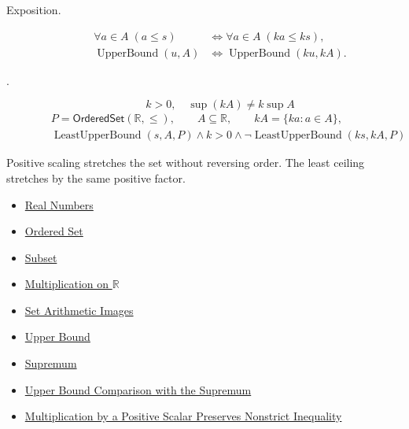 \begin{remark*}
\begin{description}
  \item[Exposition.]
\[
\begin{aligned}
\forall a\in A\;(a\leq s)
&\Longleftrightarrow
\forall a\in A\;(ka\leq ks),\\
\operatorname{UpperBound}(u,A)
&\Longleftrightarrow
\operatorname{UpperBound}(ku,kA).
\end{aligned}
\]


  \item[.]
  \[
k>0,\quad \sup(kA)\ne k\sup A
\]
\[
\begin{aligned}
&P=\mathsf{OrderedSet}(\mathbb{R},\leq),\qquad A\subseteq\mathbb{R},\qquad kA=\{ka:a\in A\},\\
&\operatorname{LeastUpperBound}(s,A,P)\land k>0\land
\neg\operatorname{LeastUpperBound}(ks,kA,P)
\end{aligned}
\]
\end{description}
\end{remark*}

\begin{remark*}[Interpretation]
Positive scaling stretches the set without reversing order. The least ceiling stretches by the same positive factor.
\end{remark*}

\begin{dependencies}
\begin{itemize}
  \item \hyperref[def:reals]{Real Numbers}
  \item \hyperref[def:ordered-set]{Ordered Set}
  \item \hyperref[def:subset]{Subset}
  \item \hyperref[def:multiplication-on-r]{Multiplication on $\mathbb{R}$}
  \item \hyperref[def:set-arithmetic-images]{Set Arithmetic Images}
  \item \hyperref[def:real-upper-bound]{Upper Bound}
  \item \hyperref[def:supremum]{Supremum}
  \item \hyperref[prop:upper-bound-comparison-with-the-supremum]{Upper Bound Comparison with the Supremum}
  \item \hyperref[thm:ineq-nonstrict-multiply-positive]{Multiplication by a Positive Scalar Preserves Nonstrict Inequality}
\end{itemize}
\end{dependencies}

